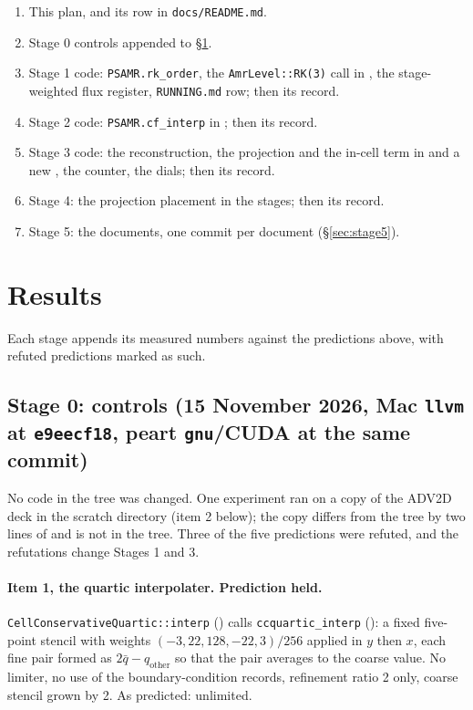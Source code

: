 \documentclass[11pt,a4paper]{article}
\newcommand{\code}[1]{\texttt{\small #1}}
\begin{document}
\begin{enumerate}[nosep]
\item This plan, and its row in \code{docs/README.md}.
\item Stage 0 controls appended to \S\ref{sec:results}.
\item Stage 1 code: \code{PSAMR.rk\_order}, the \code{AmrLevel::RK(3)}
      call in , the stage-weighted flux register,
      \code{RUNNING.md} row; then its record.
\item Stage 2 code: \code{PSAMR.cf\_interp} in ;
      then its record.
\item Stage 3 code: the reconstruction, the projection and the in-cell term
      in  and a new , the counter,
      the dials; then its record.
\item Stage 4: the projection placement in the stages; then its record.
\item Stage 5: the documents, one commit per document (\S\ref{sec:stage5}).
\end{enumerate}

\section{Results}
\label{sec:results}

Each stage appends its measured numbers against the predictions above,
with refuted predictions marked as such.

\subsection{Stage 0: controls (15 November 2026, Mac \code{llvm} at \code{e9eecf18}, peart \code{gnu}/CUDA at the same commit)}
\label{sec:stage0}

No code in the tree was changed.  One experiment ran on a copy of the
ADV2D deck in the scratch directory (item 2 below); the copy differs from
the tree by two lines of  and is not in the
tree.  Three of the five predictions were refuted, and the refutations
change Stages 1 and 3.

\paragraph{Item 1, the quartic interpolater.  Prediction held.}
\code{CellConservativeQuartic::interp} () calls
\code{ccquartic\_interp} (): a fixed five-point
stencil with weights $(-3, 22, 128, -22, 3)/256$ applied in $y$ then $x$,
each fine pair formed as $2\bar q - q_{\mathrm{other}}$ so that the pair
averages to the coarse value.  No limiter, no use of the boundary-condition
records, refinement ratio 2 only, coarse stencil grown by 2.  As predicted:
unlimited.
\end{document}
